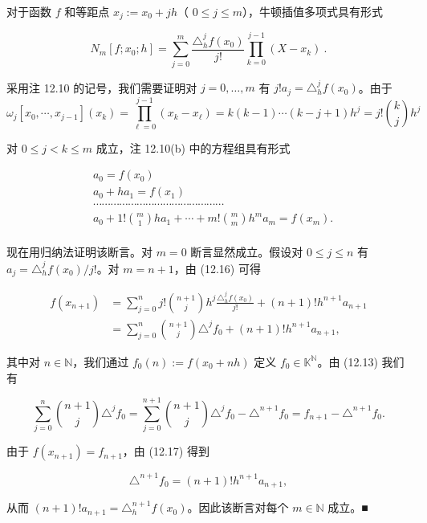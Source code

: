 \begin{proposition}

对于函数  $ f $ 和等距点  $ x_j := x_0 + jh $（ $ 0 \leq j \leq m $），牛顿插值多项式具有形式

\begin{equation}
N_{m}[f;x_{0};h]=\sum_{j=0}^{m}\frac{\triangle_{h}^{j}f(x_{0})}{j!}\prod_{k=0}^{j-1}(X-x_{k})~.
\end{equation}

\proofhead
采用注 12.10 的记号，我们需要证明对 $j = 0, \ldots, m$ 有 $j! a_j = \triangle_h^j f(x_0)$。由于
\[
\omega_{j}[x_{0},\cdots,x_{j-1}](x_{k})=\prod_{\ell=0}^{j-1}(x_{k}-x_{\ell})=k(k-1)\cdots(k-j+1)h^{j}=j!\binom{k}{j}h^{j}
\]

对  $ 0 \leq j < k \leq m $ 成立，注 12.10(b) 中的方程组具有形式

\begin{equation}
\begin{aligned}
&a_{0}=f(x_{0})\\ &a_{0}+ha_{1}=f(x_{1})\\ &\cdots\cdots\cdots\cdots\cdots\cdots\cdots\cdots\cdots\cdots\cdots\cdots\cdots\cdots\cdots\\ &a_{0}+1!\binom{m}{1}ha_{1}+\cdots+m!\binom{m}{m}h^{m}a_{m}=f(x_{m}).\\
\end{aligned}
\end{equation}

现在用归纳法证明该断言。对 $m=0$ 断言显然成立。假设对 $0 \leq j \leq n$ 有 $a_j = \triangle_h^j f(x_0)/j!$。对 $m = n+1$，由 (12.16) 可得

\begin{equation}
\begin{aligned}
f(x_{n+1})&=\sum_{j=0}^{n} j!\binom{n+1}{j}h^{j}\frac{\triangle_{h}^{j} f(x_{0})}{j!}+(n+1)!h^{n+1}a_{n+1}\\&=\sum_{j=0}^{n}\binom{n+1}{j}\triangle^{j} f_{0}+(n+1)!h^{n+1}a_{n+1},
\end{aligned}
\end{equation}

其中对  $ n \in \mathbb{N} $，我们通过  $ f_0(n) := f(x_0 + nh) $ 定义  $ f_0 \in \mathbb{K}^{\mathbb{N}} $。由 (12.13) 我们有

\[
\sum_{j=0}^{n}\binom{n+1}{j}\triangle^{j} f_{0}=\sum_{j=0}^{n+1}\binom{n+1}{j}\triangle^{j} f_{0}-\triangle^{n+1}f_{0}=f_{n+1}-\triangle^{n+1}f_{0}.
\]

由于  $ f(x_{n+1}) = f_{n+1} $，由 (12.17) 得到

\[
\triangle^{n+1}f_{0}=(n+1)!h^{n+1}a_{n+1},
\]

从而  $ (n+1)! a_{n+1} = \triangle_h^{n+1} f(x_0) $。因此该断言对每个  $ m \in \mathbb{N} $ 成立。■

\end{proposition}

